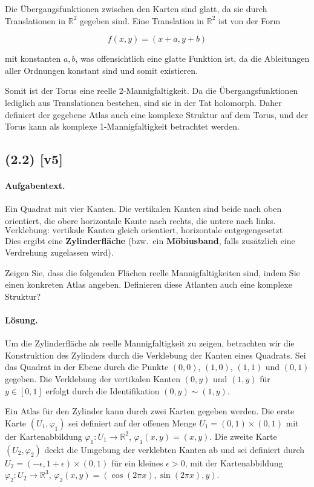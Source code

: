 \documentclass[11pt,a4paper]{article}
\begin{document}
Die Übergangsfunktionen zwischen den Karten sind glatt, da sie durch Translationen in \(\mathbb{R}^2\) gegeben sind. Eine Translation in \(\mathbb{R}^2\) ist von der Form

\[
f(x,y) = (x+a, y+b)
\]

mit konstanten \(a, b\), was offensichtlich eine glatte Funktion ist, da die Ableitungen aller Ordnungen konstant sind und somit existieren.

Somit ist der Torus eine reelle 2-Mannigfaltigkeit. Da die Übergangsfunktionen lediglich aus Translationen bestehen, sind sie in der Tat holomorph. Daher definiert der gegebene Atlas auch eine komplexe Struktur auf dem Torus, und der Torus kann als komplexe 1-Mannigfaltigkeit betrachtet werden.


\subsection*{(2.2) [v5]}
\paragraph{Aufgabentext.}
Ein Quadrat mit vier Kanten. 
Die vertikalen Kanten sind beide nach oben orientiert, 
die obere horizontale Kante nach rechts, 
die untere nach links.  
\[
\text{Verklebung: vertikale Kanten gleich orientiert, horizontale entgegengesetzt orientiert.}
\]
Dies ergibt eine \textbf{Zylinderfläche} 
(bzw.\ ein \textbf{Möbiusband}, falls zusätzlich eine Verdrehung zugelassen wird).

Zeigen Sie, dass die folgenden Flächen reelle Mannigfaltigkeiten sind, indem Sie einen konkreten Atlas angeben. Definieren diese Atlanten auch eine komplexe Struktur?

\paragraph{Lösung.}
Um die Zylinderfläche als reelle Mannigfaltigkeit zu zeigen, betrachten wir die Konstruktion des Zylinders durch die Verklebung der Kanten eines Quadrats. Sei das Quadrat in der Ebene durch die Punkte \((0,0)\), \((1,0)\), \((1,1)\) und \((0,1)\) gegeben. Die Verklebung der vertikalen Kanten \((0,y)\) und \((1,y)\) für \(y \in [0,1]\) erfolgt durch die Identifikation \((0,y) \sim (1,y)\).

Ein Atlas für den Zylinder kann durch zwei Karten gegeben werden. Die erste Karte \((U_1, \varphi_1)\) sei definiert auf der offenen Menge \(U_1 = (0,1) \times (0,1)\) mit der Kartenabbildung \(\varphi_1: U_1 \to \mathbb{R}^2\), \(\varphi_1(x,y) = (x,y)\). Die zweite Karte \((U_2, \varphi_2)\) deckt die Umgebung der verklebten Kanten ab und sei definiert durch \(U_2 = (-\epsilon, 1+\epsilon) \times (0,1)\) für ein kleines \(\epsilon > 0\), mit der Kartenabbildung \(\varphi_2: U_2 \to \mathbb{R}^3\), \(\varphi_2(x,y) = (\cos(2\pi x), \sin(2\pi x), y)\).
\end{document}
